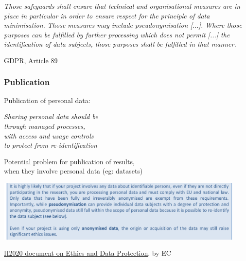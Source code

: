 \documentclass[17pt,aspectratio=169,hyperref={pdfusetitle,colorlinks,allcolors=olive}]{beamer}
\begin{document}
\begin{frame}[fragile]
\vspace{-.3cm}
  {\small \em
    Those safeguards shall ensure that technical and organisational measures are in place in particular in order to ensure respect for the principle of data minimisation. Those measures may include pseudonymisation [...]. Where those purposes can be fulfilled by further processing which
does not permit [...] the identification of data subjects, those purposes shall be fulfilled in that manner.
  }

  \begin{flushright}
    GDPR, Article 89
  \end{flushright}
\end{frame}

\begin{frame}[fragile]
  \frametitle{Publication}

  Publication of personal data: \\
  \vspace{.2cm}

  {\em
    Sharing personal data should be \\
    through managed processes, \\
    with access and usage controls \\
    to protect from re-identification
  }
  \vspace{.2cm}
  \begin{flushright}
    Potential problem for publication of results, \\
    when they involve personal data (eg: datasets) \\
  \end{flushright}
\end{frame}


\begin{frame}[fragile]

  \begin{center}
  \includegraphics[width=12.5cm]{figs/gdpr-anon-pseudoanon}
  \end{center}
  
  {\footnotesize
    \begin{flushright}
    \href{https://ec.europa.eu/research/participants/data/ref/h2020/grants_manual/hi/ethics/h2020_hi_ethics-data-protection_en.pdf}{H2020 document on Ethics and Data Protection},  by EC
  \end{flushright}
  }
  
\end{frame}
\end{document}
